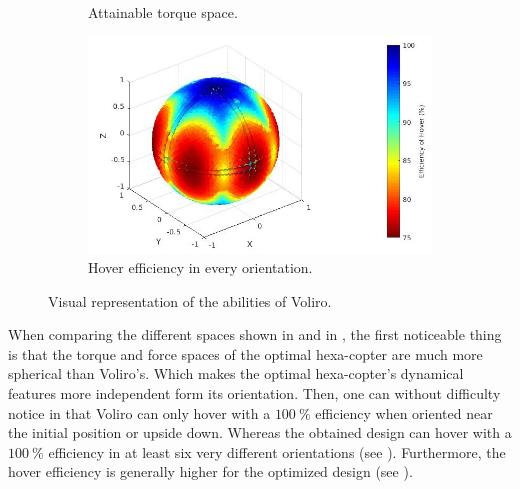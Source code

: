 \begin{figure}[!ht]
{\begin{subfigure}[b]{0.5\textwidth}
    \caption{Attainable torque space.} \label{fig:voliro_tspace}
  \end{subfigure}
  \begin{subfigure}[b]{0.52\textwidth}
    \includegraphics[width=\linewidth]{images/Voliro_hspace.jpg}
    \caption{Hover efficiency in every orientation.} \label{fig:voliro_hspace}
  \end{subfigure}}
  \caption{Visual representation of the abilities of Voliro.}
  \label{fig:Voliro_spaces}
\end{figure}

When comparing the different spaces shown in 
and in , the first noticeable thing is that the torque
and force spaces of the optimal hexa-copter are much more spherical than
Voliro’s. Which makes the optimal hexa-copter’s dynamical features more
independent form its orientation. Then, one can without difficulty notice in
 that Voliro can only hover with a $100\ \%$ efficiency
when oriented near the initial position or upside down. Whereas the obtained
design can hover with a $100\ \%$ efficiency in at least six very different orientations
(see ). Furthermore, the hover efficiency is generally
higher for the optimized design (see ).

\begin{table}[!ht]
\begin{center}
 \caption{Information on the designs’ force space properties.}\vspace{1ex}
 \label{tab:tab_Hexa_compare_force}
\end{center}
\end{table}

